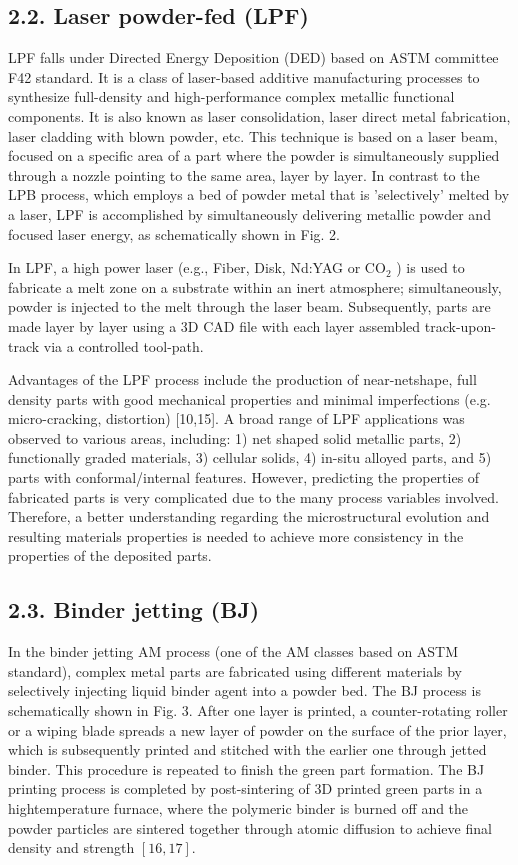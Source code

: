 \documentclass[10pt]{article}
\begin{document}
\subsection*{2.2. Laser powder-fed (LPF)}
LPF falls under Directed Energy Deposition (DED) based on ASTM committee F42 standard. It is a class of laser-based additive manufacturing processes to synthesize full-density and high-performance complex metallic functional components. It is also known as laser consolidation, laser direct metal fabrication, laser cladding with blown powder, etc. This technique is based on a laser beam, focused on a specific area of a part where the powder is simultaneously supplied through a nozzle pointing to the same area, layer by layer. In contrast to the LPB process, which employs a bed of powder metal that is 'selectively' melted by a laser, LPF is accomplished by simultaneously delivering metallic powder and focused laser energy, as schematically shown in Fig. 2.

In LPF, a high power laser (e.g., Fiber, Disk, Nd:YAG or $\mathrm{CO}_{2}$ ) is used to fabricate a melt zone on a substrate within an inert atmosphere; simultaneously, powder is injected to the melt through the laser beam. Subsequently, parts are made layer by layer using a 3D CAD file with each layer assembled track-upon-track via a controlled tool-path.

Advantages of the LPF process include the production of near-netshape, full density parts with good mechanical properties and minimal imperfections (e.g. micro-cracking, distortion) [10,15]. A broad range of LPF applications was observed to various areas, including: 1) net shaped solid metallic parts, 2) functionally graded materials, 3) cellular solids, 4) in-situ alloyed parts, and 5) parts with conformal/internal features. However, predicting the properties of fabricated parts is very complicated due to the many process variables involved. Therefore, a better understanding regarding the microstructural evolution and\\
resulting materials properties is needed to achieve more consistency in the properties of the deposited parts.

\subsection*{2.3. Binder jetting (BJ)}
In the binder jetting AM process (one of the AM classes based on ASTM standard), complex metal parts are fabricated using different materials by selectively injecting liquid binder agent into a powder bed. The BJ process is schematically shown in Fig. 3. After one layer is printed, a counter-rotating roller or a wiping blade spreads a new layer of powder on the surface of the prior layer, which is subsequently printed and stitched with the earlier one through jetted binder. This procedure is repeated to finish the green part formation. The BJ printing process is completed by post-sintering of 3D printed green parts in a hightemperature furnace, where the polymeric binder is burned off and the powder particles are sintered together through atomic diffusion to achieve final density and strength $[16,17]$.
\end{document}
